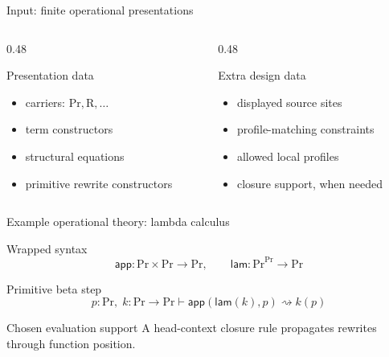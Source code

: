 \documentclass[aspectratio=169,11pt]{beamer}
\newcommand{\Proc}{\mathrm{Pr}}
\newcommand{\Rew}{\mathrm{R}}
\newcommand{\rw}{\rightsquigarrow}
\newcommand{\app}{\mathsf{app}}
\newcommand{\lam}{\mathsf{lam}}
\begin{document}
\begin{frame}{Input: finite operational presentations}

\vspace{0.5em}
\begin{columns}[T]
\begin{column}{0.48\textwidth}
\begin{block}{Presentation data}
\begin{itemize}
  \item carriers: \(\Proc,\Rew,\ldots\)
  \item term constructors
  \item structural equations
  \item primitive rewrite constructors
\end{itemize}
\end{block}

\end{column}
\begin{column}{0.48\textwidth}
\begin{block}{Extra design data}
\begin{itemize}
  \item displayed source sites
  \item profile-matching constraints
  \item allowed local profiles
  \item closure support, when needed
\end{itemize}
\end{block}
\end{column}
\end{columns}
\end{frame}

\begin{frame}{Example operational theory: lambda calculus}
\begin{block}{Wrapped syntax}
\[
  \app:\Proc\times\Proc\to\Proc,
  \qquad
  \lam:\Proc^{\Proc}\to\Proc
\]
\end{block}

\begin{block}{Primitive beta step}
\[
  p:\Proc,\; k:\Proc\to\Proc
  \vdash
  \app(\lam(k),p)\rw k(p)
\]
\end{block}

\begin{block}{Chosen evaluation support}
A head-context closure rule propagates rewrites through function position.
\end{block}
\end{frame}
\end{document}
